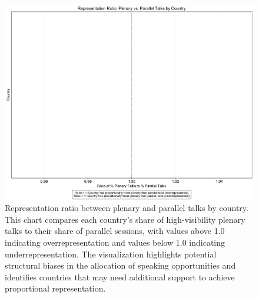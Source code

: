 \documentclass[a4paper,11pt]{article}
\begin{document}
\begin{figure}[H]
\centering
\includegraphics[width=\textwidth]{figures/representation_ratio.pdf}
\caption{Representation ratio between plenary and parallel talks by country. This chart compares each country's share of high-visibility plenary talks to their share of parallel sessions, with values above 1.0 indicating overrepresentation and values below 1.0 indicating underrepresentation. The visualization highlights potential structural biases in the allocation of speaking opportunities and identifies countries that may need additional support to achieve proportional representation.}
\label{fig:representation_ratio}
\end{figure}
\end{document}
